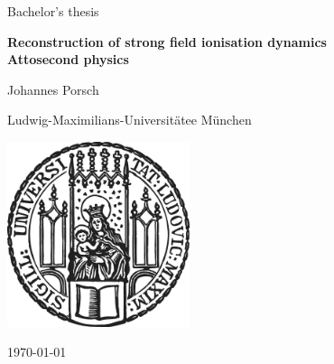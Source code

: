 \begin{titlepage}
    \centering
    
    {\Large Bachelor's thesis}
    
    \vspace{1.5cm}
    
    {\huge\bfseries Reconstruction of strong field ionisation dynamics\\[0.4cm]
    \Large Attosecond physics}
    
    \vspace{2cm}
    
    {\Large Johannes Porsch}
    
    \vspace{2cm}
    
    {\Large Ludwig-Maximilians-Universitätee München}
    
    \vfill

    \includegraphics[width = 0.4\textwidth]{figures/sigillum.png}

    \vfill
    
    {\Large \today}
    
\end{titlepage}